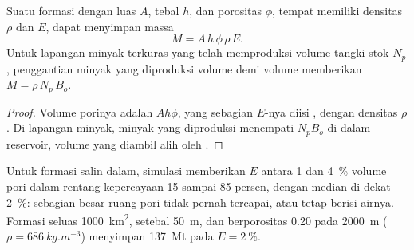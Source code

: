 \begin{omfigure}
\begin{minipage}[b]{0.49\linewidth}
\end{minipage}
\par{}
\end{omfigure}

\begin{proposition}\label{prop:b2:energy-geology:capacity}
Suatu formasi dengan luas $A$, tebal $h$, dan porositas $\phi$, tempat  memiliki densitas $\rho$
dan  $E$, dapat menyimpan massa
\begin{equation}
M = A\,h\,\phi\,\rho\,E .
\label{eq:b2:energy-geology:capacity}
\end{equation}
Untuk lapangan minyak terkuras yang telah memproduksi volume tangki stok $N_p$, penggantian minyak yang diproduksi
volume demi volume memberikan $M = \rho\,N_p\,B_o$.
\end{proposition}

\begin{proof}
Volume porinya adalah $Ah\phi$, yang sebagian $E$-nya diisi , dengan densitas $\rho$. Di lapangan
minyak, minyak yang diproduksi menempati $N_pB_o$ di dalam reservoir, volume yang diambil alih oleh .
\end{proof}

Untuk formasi salin dalam, simulasi memberikan $E$ antara 1 dan \qty{4}{\percent} volume pori
dalam rentang kepercayaan 15 sampai 85 persen, dengan median di dekat \qty{2}{\percent}: sebagian besar ruang
pori tidak pernah tercapai, atau tetap berisi airnya. Formasi seluas \qty{1000}{km^2}, setebal \qty{50}{m}, dan
berporositas 0.20 pada \qty{2000}{m} ($\rho = \qty{686}{kg.m^{-3}}$) menyimpan \qty{137}{Mt} pada $E =
\qty{2}{\percent}$.

